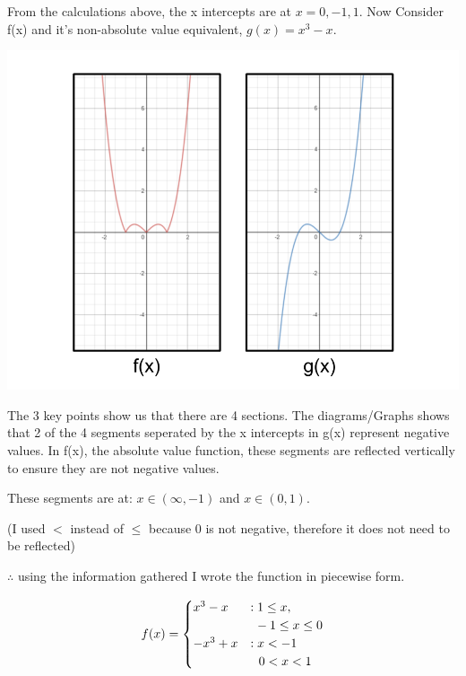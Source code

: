 \documentclass[12pt]{book}
\begin{document}
\begin{enumerate}
\vspace{-2em}
From the calculations above, the x intercepts are at $x = 0, -1, 1$. Now Consider f(x) and it's non-absolute value equivalent, $g(x) = x^3-x$.
\vspace{-1em}

\begin{center}
    \includegraphics[scale = 0.5]{A1-4 diagram.png}
\end{center}

The 3 key points show us that there are 4 sections. The diagrams/Graphs shows that 2 of the 4 segments seperated by the x intercepts in g(x) represent negative values.
In f(x), the absolute value function, these segments are reflected vertically to ensure they are not negative values.
\vspace{1em}

\begin{center}
These segments are at: $ x \in (\infty, -1) $ and $ x \in (0, 1) $.

(I used $<$ instead of $\leq$ because 0 is not negative, therefore it does not need to be reflected)
\end{center}

$\therefore$ using the information gathered I wrote the function in piecewise form.
\vspace{1em}

$$
f(x) =
\begin{cases}
    x^3-x & : 1 \leq x, \\
    & \text{\space} -1 \leq x \leq 0 \\
    -x^3+x & : x < -1 \\
    & \text{\space \space} 0 < x < 1
\end{cases}
$$


\end{enumerate}
\end{document}
